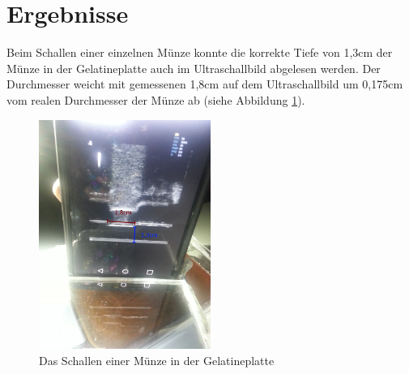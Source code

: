 \section{Ergebnisse}
Beim Schallen einer einzelnen Münze konnte die korrekte Tiefe von 1,3cm der Münze in der Gelatineplatte auch im Ultraschallbild abgelesen werden. Der Durchmesser weicht mit gemessenen 1,8cm auf dem Ultraschallbild um 0,175cm vom realen Durchmesser der Münze ab (siehe Abbildung \ref{fig:1Cent}). 
\clearpage
\begin{figure}[h]
	\centering
	\includegraphics[width=0.5\textwidth]{Bilder/Evaluation/1Cent.jpg}
	\caption{Das Schallen einer Münze in der Gelatineplatte}
	\label{fig:1Cent}
\end{figure}


